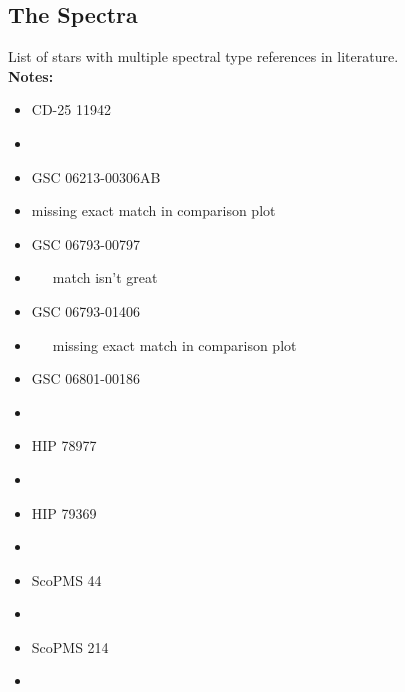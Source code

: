 \subsection{The Spectra}

\noindent List of stars with multiple spectral type references in literature.\\
{\bf Notes:}\\
\begin{itemize}
	\item{} CD-25 11942
	\item{}~~~

	\item{} GSC 06213-00306AB
	\item{} missing exact match in comparison plot

	\item{} GSC 06793-00797
	\item{}~~~match isn't great

	\item{} GSC 06793-01406
	\item{}~~~missing exact match in comparison plot

	\item{} GSC 06801-00186
	\item{}~~~

	\item{} HIP 78977
	\item{}~~~

	\item{} HIP 79369
	\item{}~~~

	\item{} ScoPMS 44
	\item{}~~~

	\item{} ScoPMS 214
	\item{}~~~
\end{itemize}